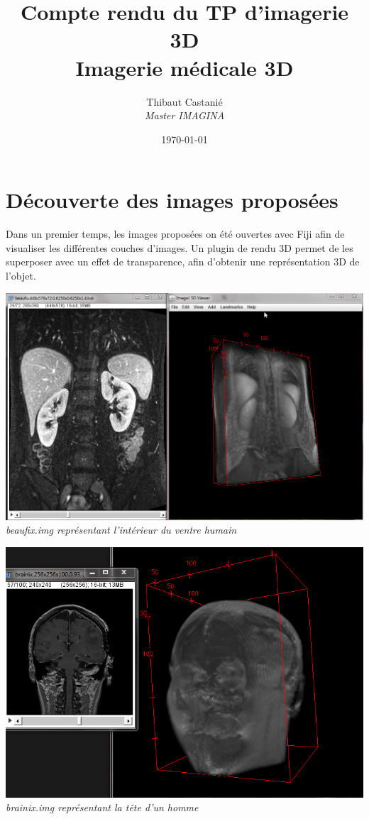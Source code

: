 \documentclass[a4paper,11pt]{article}
\begin{document}
\title{\textbf{Compte rendu du TP  d'imagerie 3D}\\Imagerie médicale 3D}
\author{Thibaut Castanié\\\textit{Master IMAGINA}}
\date{\today}

\maketitle
\thispagestyle{empty}

\newpage 
\section{Découverte des images proposées}
Dans un premier temps, les images proposées on été ouvertes avec Fiji afin de visualiser les différentes couches d'images. Un plugin de rendu 3D permet de les superposer avec un effet de transparence, afin d'obtenir une représentation 3D de l'objet.

\begin{center}
\includegraphics[scale=0.4]{beaufix.png}\\
\textit{beaufix.img représentant l'intérieur du ventre humain}
\end{center}

\begin{center}
\includegraphics[scale=0.4]{brainix.png}\\
\textit{brainix.img représentant la tête d'un homme}
\end{center}
\end{document}
